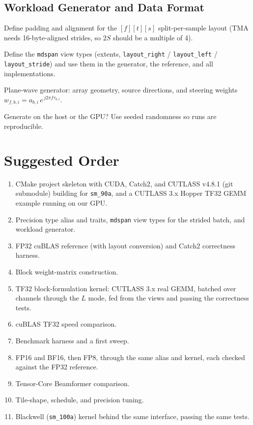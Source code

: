 \documentclass[10pt,letterpaper]{article}
\begin{document}
\subsection*{Workload Generator and Data Format}
\begin{todo}
  \item Define padding and alignment for the $[f][t][s]$ split-per-sample layout (TMA needs 16-byte-aligned strides, so $2S$ should be a multiple of 4).
  \item Define the \texttt{mdspan} view types (extents, \texttt{layout\_right} / \texttt{layout\_left} / \texttt{layout\_stride}) and use them in the generator, the reference, and all implementations.
  \item Plane-wave generator: array geometry, source directions, and steering weights $w_{f,b,i} = a_{b,i}\, e^{\,j 2\pi f \tau_{b,i}}$.
  \item Generate on the host or the GPU? Use seeded randomness so runs are reproducible.
\end{todo}

\section*{Suggested Order}
\begin{enumerate}
  \item CMake project skeleton with CUDA, Catch2, and CUTLASS v4.8.1 (git submodule) building for \texttt{sm\_90a}, and a CUTLASS 3.x Hopper TF32 GEMM example running on our GPU.
  \item Precision type alias and traits, \texttt{mdspan} view types for the strided batch, and workload generator.
  \item FP32 cuBLAS reference (with layout conversion) and Catch2 correctness harness.
  \item Block weight-matrix construction.
  \item TF32 block-formulation kernel: CUTLASS 3.x real GEMM, batched over channels through the $L$ mode, fed from the views and passing the correctness tests.
  \item cuBLAS TF32 speed comparison.
  \item Benchmark harness and a first sweep.
  \item FP16 and BF16, then FP8, through the same alias and kernel, each checked against the FP32 reference.
  \item Tensor-Core Beamformer comparison.
  \item Tile-shape, schedule, and precision tuning.
  \item Blackwell (\texttt{sm\_100a}) kernel behind the same interface, passing the same tests.
\end{enumerate}
\end{document}
